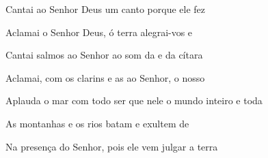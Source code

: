 \begin{greenumerate}
  \item {}Cantai ao Senhor Deus um canto  porque ele fez 

  \item {}Aclamai o Senhor Deus, ó terra  alegrai-vos e 

  \item {}Cantai salmos ao Senhor ao som da  e da cítara 

  \item {}Aclamai, com os clarins e as  ao Senhor, o nosso 

  \item {}Aplauda o mar com todo ser que nele  o mundo inteiro e toda 

  \item {}As montanhas e os rios batam  e exultem de 

  \item {}Na presença do Senhor, pois ele  vem julgar a terra 
\end{greenumerate}
